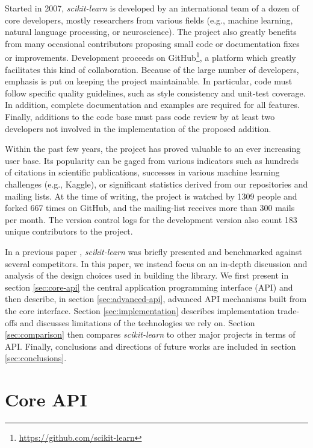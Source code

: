 \documentclass{llncs}
\newcommand{\sklearn}{\textit{scikit-learn}\xspace}
\begin{document}
Started in 2007, \sklearn is developed by an international team of a dozen of
core developers, mostly researchers from various fields (e.g., machine learning,
natural language processing, or neuroscience). The project also greatly benefits
from many occasional contributors proposing small code or documentation fixes or
improvements. Development proceeds on GitHub\footnote{\url{https://github.com/scikit-learn}},
a platform which greatly facilitates this kind of
collaboration. Because of the large number of developers, emphasis is
put on keeping the project maintainable. In particular, code must follow
specific quality guidelines, such as style consistency and unit-test coverage.
In addition, complete documentation and examples are required for all features.
Finally, additions to the code base must pass code review by at least two
developers not involved in the implementation of the proposed addition.

Within the past few years, the project has proved valuable to an ever increasing
user base. Its popularity can be gaged from various indicators such as hundreds
of citations in scientific publications, successes in various machine learning
challenges (e.g., Kaggle), or significant statistics derived from our
repositories and mailing lists.  At the time of writing, the project is watched
by 1309 people and forked 667 times on GitHub, and the mailing-list receives
more than 300 mails per month. The version control logs for the development
version
also count 183 unique contributors to the project.

In a previous paper \citep{pedregosa2011}, \sklearn was briefly presented and
benchmarked against several competitors. In this paper, we instead focus on an
in-depth discussion and analysis of the design choices used in building the
library. We first present in section \ref{sec:core-api} the central application
programming interface (API) and then describe, in section \ref{sec:advanced-api},
advanced API mechanisms built from the core interface. Section
\ref{sec:implementation} describes implementation trade-offs and discusses
limitations of the technologies we rely on. Section \ref{sec:comparison}
then compares \emph{scikit-learn} to other major projects in terms of API.
Finally, conclusions and directions of future works are included in section
\ref{sec:conclusions}.

\section{Core API}
\end{document}
